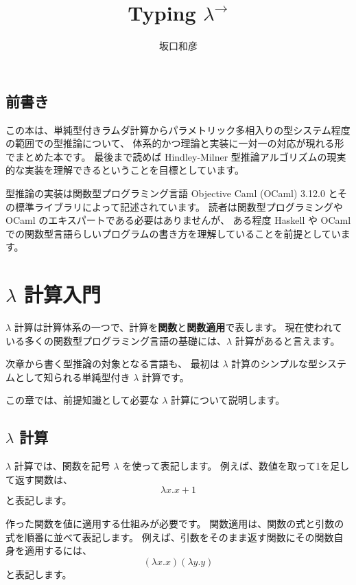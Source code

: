 \documentclass[b5paper]{jsbook}
\title{Typing $\lambda^\to$}
\author{坂口和彦}
\begin{document}
\maketitle


\section*{前書き}

この本は、単純型付きラムダ計算からパラメトリック多相入りの型システム程度の範囲での型推論について、
体系的かつ理論と実装に一対一の対応が現れる形でまとめた本です。
最後まで読めば Hindley-Milner 型推論アルゴリズムの現実的な実装を理解できるということを目標としています。

型推論の実装は関数型プログラミング言語 Objective Caml (OCaml) 3.12.0
とその標準ライブラリによって記述されています。
読者は関数型プログラミングや OCaml のエキスパートである必要はありませんが、
ある程度 Haskell や OCaml での関数型言語らしいプログラムの書き方を理解していることを前提としています。

\tableofcontents
\newpage
{}

\chapter{$\lambda$ 計算入門}

$\lambda$ 計算は計算体系の一つで、計算を\textbf{関数}と\textbf{関数適用}で表します。
現在使われている多くの関数型プログラミング言語の基礎には、$\lambda$ 計算があると言えます。

次章から書く型推論の対象となる言語も、
最初は $\lambda$ 計算のシンプルな型システムとして知られる単純型付き $\lambda$ 計算です。

この章では、前提知識として必要な $\lambda$ 計算について説明します。

\section{$\lambda$ 計算}

$\lambda$ 計算では、関数を記号 $\lambda$ を使って表記します。
例えば、数値を取って1を足して返す関数は、
\[ \lambda x. x+1 \]
と表記します。

作った関数を値に適用する仕組みが必要です。
関数適用は、関数の式と引数の式を順番に並べて表記します。
例えば、引数をそのまま返す関数にその関数自身を適用するには、
\[ (\lambda x. x) (\lambda y. y) \] と表記します。
\end{document}
